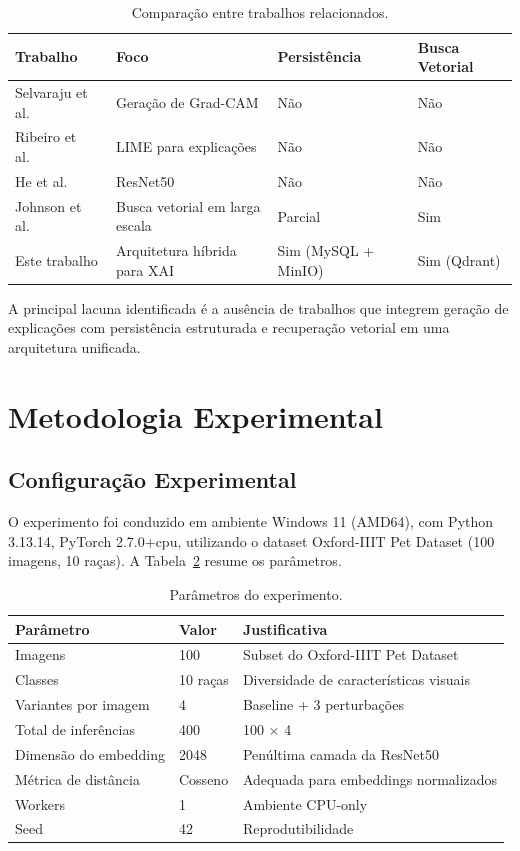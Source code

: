 \documentclass[12pt,a4paper,twoside]{article}
\begin{document}
\begin{table}[H]
\centering
\caption{Comparação entre trabalhos relacionados.}
\label{tab:relacionados}
\begin{tabular}{@{}p{3.5cm}p{3cm}p{3cm}p{3.5cm}@{}}
\toprule
\textbf{Trabalho} & \textbf{Foco} & \textbf{Persistência} & \textbf{Busca Vetorial} \\
\midrule
Selvaraju et al.~\cite{selvaraju2017grad} & Geração de Grad-CAM & Não & Não \\
Ribeiro et al.~\cite{ribeiro2016should} & LIME para explicações & Não & Não \\
He et al.~\cite{he2016deep} & ResNet50 & Não & Não \\
Johnson et al.~\cite{johnson2019billion} & Busca vetorial em larga escala & Parcial & Sim \\
Este trabalho & Arquitetura híbrida para XAI & Sim (MySQL + MinIO) & Sim (Qdrant) \\
\bottomrule
\end{tabular}
\end{table}

A principal lacuna identificada é a ausência de trabalhos que integrem geração de explicações com persistência estruturada e recuperação vetorial em uma arquitetura unificada.

\section{Metodologia Experimental}
\label{sec:metodologia}

\subsection{Configuração Experimental}

O experimento foi conduzido em ambiente Windows 11 (AMD64), com Python 3.13.14, PyTorch 2.7.0+cpu, utilizando o dataset Oxford-IIIT Pet Dataset (100 imagens, 10 raças). A Tabela~\ref{tab:config} resume os parâmetros.

\begin{table}[H]
\centering
\caption{Parâmetros do experimento.}
\label{tab:config}
\begin{tabular}{@{}lll@{}}
\toprule
\textbf{Parâmetro} & \textbf{Valor} & \textbf{Justificativa} \\
\midrule
Imagens & 100 & Subset do Oxford-IIIT Pet Dataset \\
Classes & 10 raças & Diversidade de características visuais \\
Variantes por imagem & 4 & Baseline + 3 perturbações \\
Total de inferências & 400 & 100 $\times$ 4 \\
Dimensão do embedding & 2048 & Penúltima camada da ResNet50 \\
Métrica de distância & Cosseno & Adequada para embeddings normalizados \\
Workers & 1 & Ambiente CPU-only \\
Seed & 42 & Reprodutibilidade \\
\bottomrule
\end{tabular}
\end{table}
\end{document}
